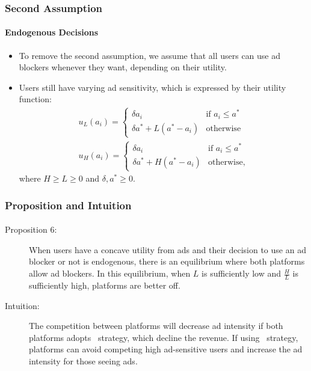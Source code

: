 \documentclass{beamer}
\newcommand{\hl}[1]{\textcolor{myblue}{#1}}
\newcommand{\ban}{\textch{\textcolor{myblue}{Ban}}}
\newcommand{\al}{\textch{\textcolor{myblue}{Allow}}}
\begin{document}
\begin{frame}%
    \frametitle{Second Assumption}
    \framesubtitle{Endogenous Decisions}
    \begin{itemize}
        \item To remove the second assumption, we assume that 
            \hl{all users can use ad blockers whenever they want}, depending on their utility.
        \item Users still have varying ad sensitivity, which is expressed by their utility function:
            \[
                \begin{array}{L}
                    u_L(a_i)= \begin{cases}
                        \delta a_i & \text{if } a_i\leq a^* \\
                        \delta a^* + L(a^*-a_i) & \text{otherwise}
                    \end{cases} \\
                    u_H(a_i)= \begin{cases}
                        \delta a_i & \text{if } a_i\leq a^* \\
                        \delta a^* + H(a^*-a_i) & \text{otherwise,}
                    \end{cases}
                \end{array}
            \]
            where $H\geq L\geq0$ and $\delta,a^*\geq0$.
    \end{itemize}
\end{frame}

\begin{frame}%
    \frametitle{Proposition and Intuition}
    \framesubtitle{}
    \begin{description}
        \item[Proposition 6:] When users have a concave utility from ads
            and their decision to use an ad blocker or not is endogenous, 
            there is an equilibrium where both platforms allow ad blockers. 
            In this equilibrium, when $L$ is sufficiently low and 
            $\frac{H}{L}$ is sufficiently high,
            platforms are better off.
        \item[Intuition:] 
            The competition between platforms will decrease ad intensity if both platforms
            adopts \ban\ strategy, which decline the revenue. If using \al\ strategy,
            platforms can avoid competing high ad-sensitive users and increase the 
            ad intensity for those seeing ads.
    \end{description}
\end{frame}
\end{document}
